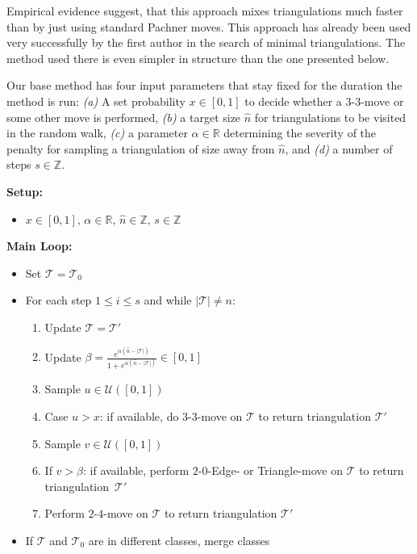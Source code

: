 \documentclass[pdflatex,sn-mathphys-num]{sn-jnl}
\theoremstyle{thmstyleone}%
\theoremstyle{thmstyletwo}%
\theoremstyle{thmstylethree}%
\newcommand{\tri}{\mathcal{T}}
\theoremstyle{remark}
\begin{document}
Empirical evidence suggest, that this approach mixes triangulations much faster than by just using standard Pachner moves. This approach has already been used very successfully by the first author \cite{Burke-SoftwareJoCGver} in the search of minimal triangulations. The method used there is even simpler in structure than the one presented below.

Our base method has four input parameters that stay fixed for the duration the method is run: {\em (a)} A set probability $x \in [0,1]$ to decide whether a $3$-$3$-move or some other move is performed,  {\em (b)} a target size $\hat{n}$ for triangulations to be visited in the random walk,  {\em (c)} a parameter $\alpha \in \mathbb{R}$ determining the severity of the penalty for sampling a triangulation of size away from $\hat{n}$, and  {\em (d)} a number of steps $s \in \mathbb{Z}$.

\begin{tcolorbox}[colframe=blue!75!green!75,title=Heuristic 1]
\textbf{Setup:}
  \begin{itemize}
      \item $x \in [0,1]$, $\alpha \in \mathbb{R}$, $\hat{n} \in \mathbb{Z}$, $s \in \mathbb{Z}$
  \end{itemize}
\textbf{Main Loop:}
\begin{itemize}
  \item Set $\tri = \tri_0$ 
  \item For each step $1 \leq i \leq s$ and while $|\tri| \neq n$:
  \begin{enumerate}
      \item Update $\tri = \tri'$
      \item Update $\beta = \frac{e^{\alpha (\hat{n}-|\tri|)}}{1+e^{\alpha (\hat{n}-|\tri|)}} \in [0,1]$
      \item Sample $u \in \mathcal{U}([0,1])$
      \item Case $u > x$: if available, do $3$-$3$-move on $\tri$ to return triangulation $\tri'$
      \item Sample $v\in \mathcal{U}([0,1])$
      \item If $v > \beta$: if available, perform $2$-$0$-Edge- or Triangle-move on $\tri$ to return triangulation~$\tri'$
      \item Perform $2$-$4$-move on $\tri$ to return triangulation $\tri'$
  \end{enumerate}
  \item If $\tri$ and $\tri_0$ are in different classes, merge classes
\end{itemize}
\end{tcolorbox}
\end{document}
